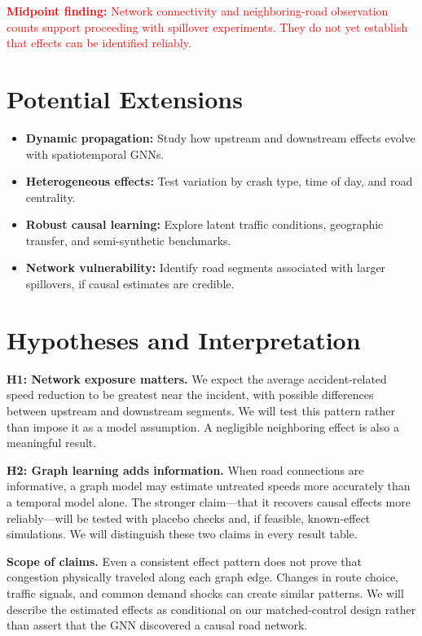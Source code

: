 \documentclass[sigconf,nonacm]{acmart}
\begin{document}
\textcolor{red}{\textbf{Midpoint finding:} Network connectivity
and neighboring-road observation counts support proceeding with
spillover experiments. They do not yet establish that effects can be
identified reliably.}

\section{Potential Extensions}
\begin{itemize}
    \item \textbf{Dynamic propagation:} Study how upstream and
    downstream effects evolve with spatiotemporal GNNs.
    \item \textbf{Heterogeneous effects:} Test variation by crash type,
    time of day, and road centrality.
    \item \textbf{Robust causal learning:} Explore latent traffic
    conditions, geographic transfer, and semi-synthetic benchmarks.
    \item \textbf{Network vulnerability:} Identify road segments
    associated with larger spillovers, if causal estimates are credible.
\end{itemize}

\section{Hypotheses and Interpretation}
\textbf{H1: Network exposure matters.} We expect the average
accident-related speed reduction to be greatest near the incident,
with possible differences between upstream and downstream segments.
We will test this pattern rather than impose it as a model assumption.
A negligible neighboring effect is also a meaningful result.

\textbf{H2: Graph learning adds information.} When road connections
are informative, a graph model may estimate untreated speeds more
accurately than a temporal model alone. The stronger claim---that it
recovers causal effects more reliably---will be tested with placebo
checks and, if feasible, known-effect simulations. We will distinguish
these two claims in every result table.

\textbf{Scope of claims.} Even a consistent effect pattern does not
prove that congestion physically traveled along each graph edge.
Changes in route choice, traffic signals, and common demand shocks
can create similar patterns. We will describe the estimated effects
as conditional on our matched-control design rather than assert
that the GNN discovered a causal road network.
\end{document}
